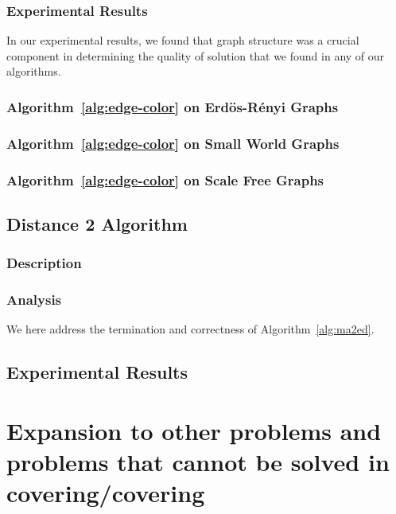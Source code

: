 \documentclass[twoside]{article}
\begin{document}
\subsubsection{Experimental Results}

In our experimental results, we found that graph structure was a crucial component in determining the quality of solution that we found in any of our algorithms.

\subsubsection{Algorithm~\ref{alg:edge-color} on Erd\"{o}s-R\'{e}nyi Graphs}


\subsubsection{Algorithm~\ref{alg:edge-color} on Small World Graphs}


\subsubsection{Algorithm~\ref{alg:edge-color} on Scale Free Graphs}
\label{sub:experiment:scalefree}


\subsection{Distance 2 Algorithm}
\subsubsection{Description}
\label{sub:dima2ed-description}



\subsubsection{Analysis}
We here address the termination and correctness of Algorithm~\ref{alg:ma2ed}.


\subsection{Experimental Results}
\label{sub:experiment-erdren-direct}

\section{Expansion to other problems and problems that cannot be solved in covering/covering}



\end{document}
